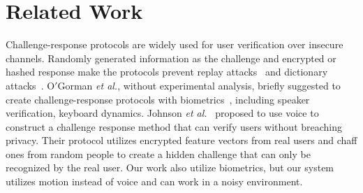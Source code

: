 \section{Related Work}
\label{sec:related}



Challenge-response protocols are widely used for user verification over insecure channels. Randomly generated information as the challenge and encrypted or hashed response make the protocols prevent replay attacks~\cite{Securityforcomputernetworks} and dictionary attacks~\cite{Bellovin92encryptedkey}. %
O$'$Gorman \textit{et al.}, without experimental analysis, briefly suggested to create challenge-response protocols with biometrics~\cite{Gorman2003ComparingPasswords}, including speaker verification, keyboard dynamics.  %
Johnson \textit{et al.}~\cite{johnson2013SPIE} proposed to use voice to construct a challenge response method that can verify users without breaching privacy. Their protocol utilizes encrypted feature vectors from real users and chaff ones from random people to create a hidden challenge that can only be recognized by the real user. Our work also utilize biometrics, but our system utilizes motion instead of voice and can work in a noisy environment. %

